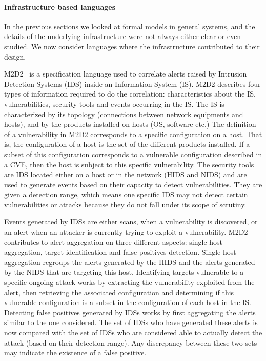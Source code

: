 \paragraph{Infrastructure based languages}
In the previous sections we looked at formal models in general systems, and the details of the underlying infrastructure were not always either clear or even studied. We now consider languages where the infrastructure contributed to their design.

M2D2~\cite{M2D2-Morin2002} is a specification language used to correlate alerts raised by Intrusion Detection Systems (IDS) inside an Information System (IS).
M2D2 describes four types of information required to do the correlation: characteristics about the IS, vulnerabilities, security tools and events occurring in the IS.
The IS is characterized by its topology (connections between network equipments and hosts), and by the products installed on hosts (\eg OS, software etc.)
The definition of a vulnerability in M2D2 corresponds to a specific configuration on a host.
That is, the configuration of a host is the set of the different products installed.
If a subset of this configuration corresponds to a vulnerable configuration described in a CVE, then the host is subject to this specific vulnerability.
The security tools are IDS located either on a host or in the network (HIDS and NIDS) and are used to generate events based on their capacity to detect vulnerabilities.
They are given a detection range, which means one specific IDS may not detect certain vulnerabilities or attacks because they do not fall under its scope of scrutiny. 

Events generated by IDSs are either scans, when a vulnerability is discovered, or an alert when an attacker is currently trying to exploit a vulnerability.
M2D2 contributes to alert aggregation on three different aspects: single host aggregation, target identification and false positives detection.
Single host aggregation regroups the alerts generated by the HIDS and the alerts generated by the NIDS that are targeting this host.
Identifying targets vulnerable to a specific ongoing attack works by extracting the vulnerability exploited from the alert, then retrieving the associated configuration and determining if this vulnerable configuration is a subset in the configuration of each host in the IS.
Detecting false positives generated by IDSs works by first aggregating the alerts similar to the one considered.
The set of IDSs who have generated these alerts is now compared with the set of IDSs who are considered able to actually detect the attack (based on their detection range).
Any discrepancy between these two sets may indicate the existence of a false positive.

